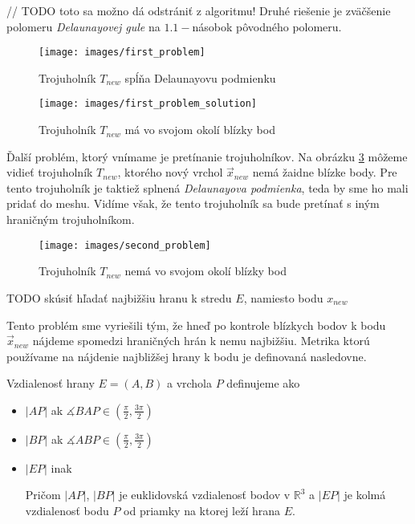 // TODO toto sa možno dá odstrániť z algoritmu!
Druhé riešenie je zväčšenie polomeru \textit{Delaunayovej gule} na $1.1-$násobok pôvodného polomeru.

\begin{figure}
    \centerline{\texttt{[image: images/first\_problem]}}
    \caption[Trojuholník $T_{new}$ spĺňa Delaunayovu podmienku]{Trojuholník $T_{new}$ spĺňa Delaunayovu podmienku}
    \label{obr:first_problem}
\end{figure}

\begin{figure}
    \centerline{\texttt{[image: images/first\_problem\_solution]}}
    \caption[Trojuholník $T_{new}$ má vo svojom okolí blízky bod]{Trojuholník $T_{new}$ má vo svojom okolí blízky bod}
    \label{obr:first_problem_solution}
\end{figure}

Ďalší problém, ktorý vnímame je pretínanie trojuholníkov. Na obrázku \ref{obr:second_problem} môžeme
vidieť trojuholník $T_{new}$, ktorého nový vrchol $\overrightarrow{x}_{new}$ nemá žaidne blízke body. Pre tento trojuholník
je taktiež splnená \textit{Delaunayova podmienka}, teda by sme ho mali pridať do meshu. Vidíme však, že
tento trojuholník sa bude pretínať s iným hraničným trojuholníkom.

\begin{figure}
    \centerline{\texttt{[image: images/second\_problem]}}
    \caption[Trojuholník $T_{new}$ nemá vo svojom okolí blízky bod]{Trojuholník $T_{new}$ nemá vo svojom okolí blízky bod}
    \label{obr:second_problem}
\end{figure}



TODO skúsiť hľadať najbižšiu hranu k stredu $E$, namiesto bodu $x_{new}$

Tento problém sme vyriešili tým, že hneď po kontrole blízkych bodov k bodu 
$\overrightarrow{x}_{new}$ nájdeme spomedzi hraničných hrán k nemu najbižšiu. 
Metrika ktorú používame na nájdenie najbližšej hrany k bodu je definovaná nasledovne.

\begin{definition} Vzdialenosť hrany $E=(A,B)$ a vrchola $P$ definujeme ako
\begin{itemize}
    \item{
        $|AP|$ ak $\measuredangle BAP \in (\frac{\pi}{2}, \frac{3\pi}{2})$
    }

    \item{
        $|BP|$ ak $\measuredangle ABP \in (\frac{\pi}{2}, \frac{3\pi}{2})$
    }

    \item{
        $|EP|$ inak
    }

    
    Pričom $|AP|$, $|BP|$ je euklidovská vzdialenosť bodov v $\mathbb{R}^3$ a $|EP|$ je kolmá 
    vzdialenosť bodu $P$ od priamky na ktorej leží hrana $E$.
\end{itemize}

\end{definition}

